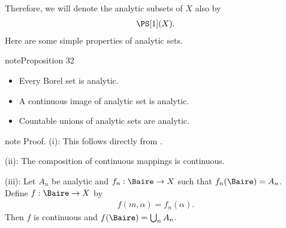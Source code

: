 \documentclass[letterpaper,10pt,english]{jupyterBook}
\begin{document}
\sphinxAtStartPar
Therefore, we will denote the analytic subsets of \(X\) also by
\begin{equation*}
\begin{split}
	\PS[1](X).
\end{split}
\end{equation*}
\sphinxAtStartPar
Here are some simple properties of analytic sets.
\label{analytic:prop-prop-analytic}
\begin{sphinxadmonition}{note}{Proposition 32}


\begin{itemize}
\item {} 
\sphinxAtStartPar
{} Every Borel set is analytic.

\item {} 
\sphinxAtStartPar
{} A continuous image of analytic set is analytic.

\item {} 
\sphinxAtStartPar
{} Countable unions of analytic sets are analytic.

\end{itemize}
\end{sphinxadmonition}

\begin{sphinxadmonition}{note}
\sphinxAtStartPar
Proof. (i): This follows directly from {\hyperref[\detokenize{imagesBorel:cor-Borel-image-closed}]{}}.

\sphinxAtStartPar
(ii): The composition of continuous mappings is continuous.

\sphinxAtStartPar
(iii): Let \(A_n\) be analytic and \(f_n:\Baire \to X\) such that \(f_n(\Baire) = A_n\). Define \(f: \Baire \to X\) by
\begin{equation*}
\begin{split}
    f(m,\alpha) = f_n(\alpha).
\end{split}
\end{equation*}
\sphinxAtStartPar
Then \(f\) is continuous and \(f(\Baire) = \bigcup_n A_n\).
\end{sphinxadmonition}
\end{document}
